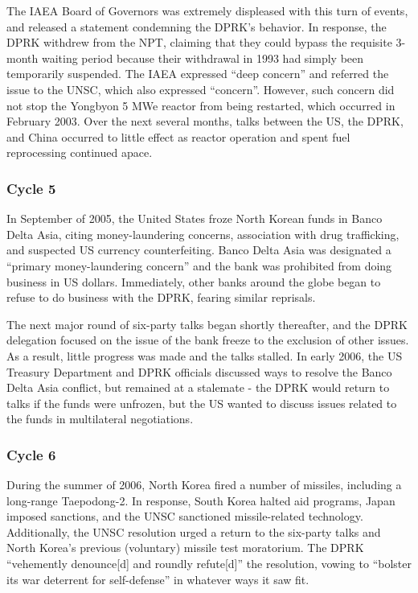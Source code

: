 \documentclass{article}
\begin{document}
The IAEA Board of Governors was extremely displeased with this turn of events, and released a statement condemning the DPRK’s behavior\cite{iaea03}. In response, the DPRK withdrew from the NPT, claiming that they could bypass the requisite 3-month waiting period because their withdrawal in 1993 had simply been temporarily suspended\cite{kcna4}. The IAEA expressed “deep concern” and referred the issue to the UNSC, which also expressed “concern”\cite{iaea09}. However, such concern did not stop the Yongbyon 5 MWe reactor from being restarted, which occurred in February 2003\cite{davenport}. Over the next several months, talks between the US, the DPRK, and China occurred to little effect as reactor operation and spent fuel reprocessing continued apace\cite{davenport}.

\subsubsection{Cycle 5}
In September of 2005, the United States froze North Korean funds in Banco Delta Asia, citing money-laundering concerns, association with drug trafficking, and suspected US currency counterfeiting\cite{davenport}. Banco Delta Asia was designated a “primary money-laundering concern” and the bank was prohibited from doing business in US dollars. Immediately, other banks around the globe began to refuse to do business with the DPRK, fearing similar reprisals\cite{greenlees}.

The next major round of six-party talks began shortly thereafter, and the DPRK delegation focused on the issue of the bank freeze to the exclusion of other issues\cite{greenlees}. As a result, little progress was made and the talks stalled. In early 2006, the US Treasury Department and DPRK officials discussed ways to resolve the Banco Delta Asia conflict, but remained at a stalemate - the DPRK would return to talks if the funds were unfrozen, but the US wanted to discuss issues related to the funds in multilateral negotiations\cite{greenlees}.

\subsubsection{Cycle 6}

During the summer of 2006, North Korea fired a number of missiles, including a long-range Taepodong-2. In response, South Korea halted aid programs, Japan imposed sanctions, and the UNSC sanctioned missile-related technology\cite{greenlees}. Additionally, the UNSC resolution urged a return to the six-party talks and North Korea’s previous (voluntary) missile test moratorium\cite{unsc06}. The DPRK “vehemently denounce[d] and roundly refute[d]” the resolution, vowing to “bolster its war deterrent for self-defense” in whatever ways it saw fit\cite{kcna5}.
\end{document}
